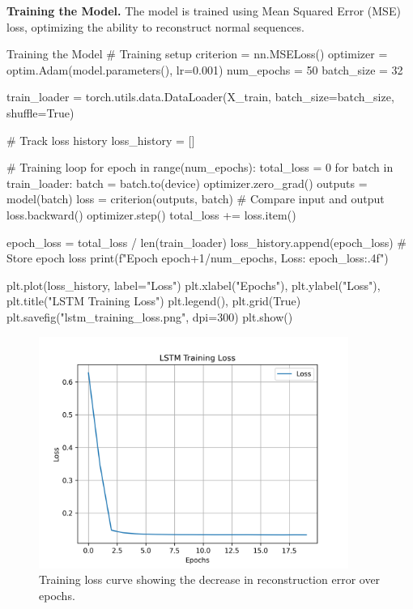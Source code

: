 {\bf Training the Model.} 
The model is trained using Mean Squared Error (MSE) loss, optimizing the ability to reconstruct normal sequences.

\begin{codeonly}{Training the Model}
# Training setup
criterion = nn.MSELoss()
optimizer = optim.Adam(model.parameters(), lr=0.001)
num_epochs = 50
batch_size = 32

train_loader = torch.utils.data.DataLoader(X_train, batch_size=batch_size, shuffle=True)

# Track loss history
loss_history = []

# Training loop
for epoch in range(num_epochs):
    total_loss = 0
    for batch in train_loader:
        batch = batch.to(device)
        optimizer.zero_grad()
        outputs = model(batch)
        loss = criterion(outputs, batch)  # Compare input and output
        loss.backward()
        optimizer.step()
        total_loss += loss.item()

    epoch_loss = total_loss / len(train_loader)
    loss_history.append(epoch_loss)  # Store epoch loss
    print(f"Epoch {epoch+1}/{num_epochs}, Loss: {epoch_loss:.4f}")

plt.plot(loss_history, label="Loss")
plt.xlabel("Epochs"), plt.ylabel("Loss"), plt.title("LSTM Training Loss")
plt.legend(), plt.grid(True)
plt.savefig("lstm_training_loss.png", dpi=300)
plt.show()
\end{codeonly}

\begin{figure}[ht]
    \centering
    \includegraphics[width=0.9\textwidth]{images/lstm_training_loss.png}
    \caption{Training loss curve showing the decrease in reconstruction error over epochs.}
    \label{fig:training_loss}
\end{figure}


